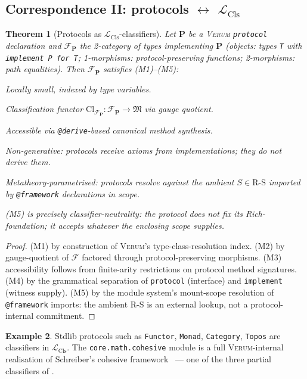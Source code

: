 \documentclass[11pt, a4paper]{article}
\newtheorem{theorem}{Theorem}[section]
\theoremstyle{definition}
\newtheorem{example}[theorem]{Example}
\theoremstyle{remark}
\newcommand{\RS}{\mathrm{R\text{-}S}}
\newcommand{\cF}{\mathcal{F}}
\newcommand{\fM}{\mathfrak{M}}
\newcommand{\LCls}{\mathcal{L}_{\mathrm{Cls}}}
\newcommand{\Cl}{\mathrm{Cl}}
\newcommand{\Verum}{\textsc{Verum}}
\begin{document}
\subsection{Correspondence II: protocols $\leftrightarrow$ $\LCls$}
\label{subsec:corr2}

\begin{theorem}[Protocols as $\LCls$-classifiers]
\label{thm:cls-correspondence}
Let $\mathbf{P}$ be a \Verum{} \texttt{protocol} declaration and $\cF_{\mathbf{P}}$ the 2-category of types implementing $\mathbf{P}$ (objects: types \texttt{T} with \texttt{implement P for T}; 1-morphisms: protocol-preserving functions; 2-morphisms: path equalities). Then $\cF_{\mathbf{P}}$ satisfies (M1)--(M5):
\begin{description}[nosep]
\item[(M1)] Locally small, indexed by type variables.
\item[(M2)] Classification functor $\Cl_{\cF_{\mathbf{P}}} : \cF_{\mathbf{P}} \to \fM$ via gauge quotient.
\item[(M3)] Accessible via \texttt{@derive}-based canonical method synthesis.
\item[(M4)] Non-generative: protocols receive axioms from implementations; they do not derive them.
\item[(M5)] Metatheory-parametrised: protocols resolve against the ambient $S \in \RS$ imported by \texttt{@framework} declarations in scope.
\end{description}
(M5) is precisely classifier-neutrality: the protocol does not fix its Rich-foundation; it accepts whatever the enclosing scope supplies.
\end{theorem}

\begin{proof}
(M1) by construction of \Verum{}'s type-class-resolution index. (M2) by gauge-quotient of $\cF$ factored through protocol-preserving morphisms. (M3) accessibility follows from finite-arity restrictions on protocol method signatures. (M4) by the grammatical separation of \texttt{protocol} (interface) and \texttt{implement} (witness supply). (M5) by the module system's mount-scope resolution of \texttt{@framework} imports: the ambient R-S is an external lookup, not a protocol-internal commitment.
\end{proof}

\begin{example}
Stdlib protocols such as \texttt{Functor}, \texttt{Monad}, \texttt{Category}, \texttt{Topos} are classifiers in $\LCls$. The \texttt{core.math.cohesive} module is a full \Verum{}-internal realisation of Schreiber's cohesive framework~\cite{Schreiber2013} --- one of the three partial classifiers of \cite[Theorem \texttt{thm:meta-mult}]{Sereda2026MSFS}.
\end{example}
\end{document}
